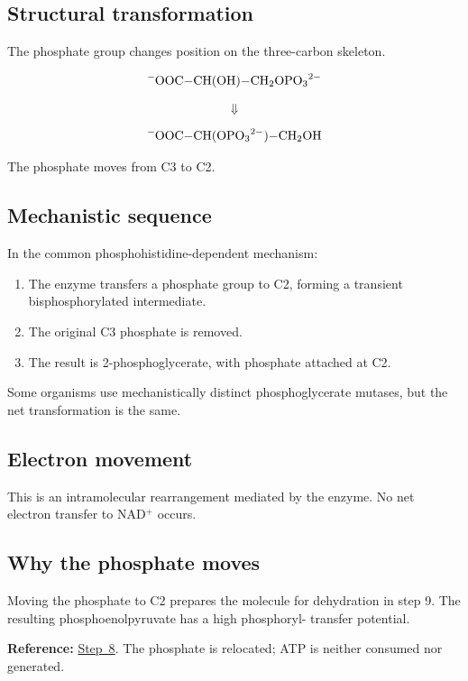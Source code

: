 \documentclass[11pt,a4paper]{article}
\newcommand{\stepref}[1]{\hyperref[step:#1]{Step~#1}}
\newcommand{\Note}[1]{\par\smallskip
  \noindent\colorbox{gray!12}{
    \parbox{0.96\linewidth}{#1}
  }\par\smallskip}
\begin{document}
\subsection{Structural transformation}

The phosphate group changes position on the three-carbon skeleton.

\[
\ce{
^-OOC-CH(OH)-CH2OPO3^{2-}
}
\]

\[
\Downarrow
\]

\[
\ce{
^-OOC-CH(OPO3^{2-})-CH2OH
}
\]

The phosphate moves from C3 to C2.

\subsection{Mechanistic sequence}

In the common phosphohistidine-dependent mechanism:

\begin{enumerate}
  \item The enzyme transfers a phosphate group to C2, forming
  a transient bisphosphorylated intermediate.
  \item The original C3 phosphate is removed.
  \item The result is 2-phosphoglycerate, with phosphate attached
  at C2.
\end{enumerate}

Some organisms use mechanistically distinct phosphoglycerate
mutases, but the net transformation is the same.

\subsection{Electron movement}

This is an intramolecular rearrangement mediated by the enzyme.
No net electron transfer to NAD$^+$ occurs.

\subsection{Why the phosphate moves}

Moving the phosphate to C2 prepares the molecule for dehydration
in step 9. The resulting phosphoenolpyruvate has a high phosphoryl-
transfer potential.

\Note{
\textbf{Reference:} \stepref{8}. The phosphate is relocated;
ATP is neither consumed nor generated.
}

\end{document}
